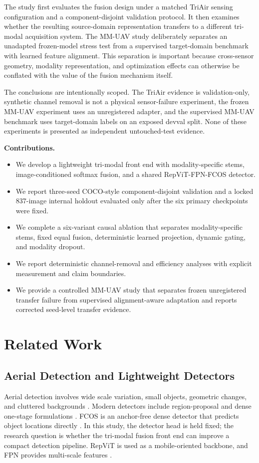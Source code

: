 \documentclass[pdflatex,sn-basic,Numbered,iicol]{sn-jnl}
\begin{document}
The study first evaluates the fusion design under a matched TriAir sensing configuration and a component-disjoint validation protocol. It then examines whether the resulting source-domain representation transfers to a different tri-modal acquisition system. The MM-UAV study deliberately separates an unadapted frozen-model stress test from a supervised target-domain benchmark with learned feature alignment. This separation is important because cross-sensor geometry, modality representation, and optimization effects can otherwise be conflated with the value of the fusion mechanism itself.

The conclusions are intentionally scoped. The TriAir evidence is validation-only, synthetic channel removal is not a physical sensor-failure experiment, the frozen MM-UAV experiment uses an unregistered adapter, and the supervised MM-UAV benchmark uses target-domain labels on an exposed devval split. None of these experiments is presented as independent untouched-test evidence.

\noindent\textbf{Contributions.}
\begin{itemize}
    \item We develop a lightweight tri-modal front end with modality-specific stems, image-conditioned softmax fusion, and a shared RepViT-FPN-FCOS detector.
    \item We report three-seed COCO-style component-disjoint validation and a locked 837-image internal holdout evaluated only after the six primary checkpoints were fixed.
    \item We complete a six-variant causal ablation that separates modality-specific stems, fixed equal fusion, deterministic learned projection, dynamic gating, and modality dropout.
    \item We report deterministic channel-removal and efficiency analyses with explicit measurement and claim boundaries.
    \item We provide a controlled MM-UAV study that separates frozen unregistered transfer failure from supervised alignment-aware adaptation and reports corrected seed-level transfer evidence.
\end{itemize}

\section{Related Work}
\subsection{Aerial Detection and Lightweight Detectors}
Aerial detection involves wide scale variation, small objects, geometric changes, and cluttered backgrounds \cite{cheng2016survey,zhu2017deepRS,xia2022dota}. Modern detectors include region-proposal and dense one-stage formulations \cite{ren2017faster,lin2020focal}. FCOS is an anchor-free dense detector that predicts object locations directly \cite{tian2019fcos}. In this study, the detector head is held fixed; the research question is whether the tri-modal fusion front end can improve a compact detection pipeline. RepViT is used as a mobile-oriented backbone, and FPN provides multi-scale features \cite{wang2024repvit,lin2017fpn}.
\end{document}
